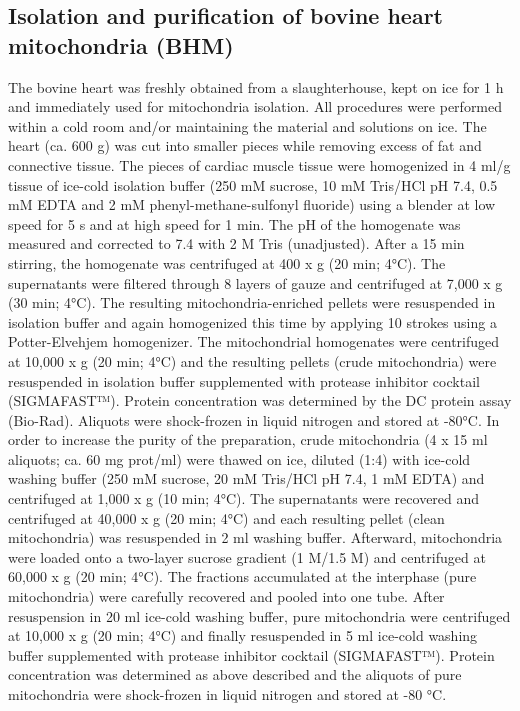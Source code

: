 \subsection*{Isolation and purification of bovine heart mitochondria (BHM)}
The bovine heart was freshly obtained from a slaughterhouse, kept on ice for 1 h and immediately used for mitochondria isolation. All procedures were performed within a cold room and/or maintaining the material and solutions on ice. The heart (ca. 600 g) was cut into smaller pieces while removing excess of fat and connective tissue. The pieces of cardiac muscle tissue were homogenized in 4 ml/g tissue of ice-cold isolation buffer (250 mM sucrose, 10 mM Tris/HCl pH 7.4, 0.5 mM EDTA and 2 mM phenyl-methane-sulfonyl fluoride) using a blender at low speed for 5 s and at high speed for 1 min. The pH of the homogenate was measured and corrected to 7.4 with 2 M Tris (unadjusted). After a 15 min stirring, the homogenate was centrifuged at 400 x g (20 min; 4°C). The supernatants were filtered through 8 layers of gauze and centrifuged at 7,000 x g (30 min; 4°C). The resulting mitochondria-enriched pellets were resuspended in isolation buffer and again homogenized this time by applying 10 strokes using a Potter-Elvehjem homogenizer. The mitochondrial homogenates were centrifuged at 10,000 x g (20 min; 4°C) and the resulting pellets (crude mitochondria) were resuspended in isolation buffer supplemented with protease inhibitor cocktail (SIGMAFAST™). Protein concentration was determined by the DC protein assay (Bio-Rad). Aliquots were shock-frozen in liquid nitrogen and stored at -80°C. In order to increase the purity of the preparation, crude mitochondria (4 x 15 ml aliquots; ca. 60 mg prot/ml) were thawed on ice, diluted (1:4) with ice-cold washing buffer (250 mM sucrose, 20 mM Tris/HCl pH 7.4, 1 mM EDTA) and centrifuged at 1,000 x g (10 min; 4°C). The supernatants were recovered and centrifuged at 40,000 x g (20 min; 4°C) and each resulting pellet (clean mitochondria) was resuspended in 2 ml washing buffer. Afterward, mitochondria were loaded onto a two-layer sucrose gradient (1 M/1.5 M) and centrifuged at 60,000 x g (20 min; 4°C). The fractions accumulated at the interphase (pure mitochondria) were carefully recovered and pooled into one tube. After resuspension in 20 ml ice-cold washing buffer, pure mitochondria were centrifuged at 10,000 x g (20 min; 4°C) and finally resuspended in 5 ml ice-cold washing buffer supplemented with protease inhibitor cocktail (SIGMAFAST™). Protein concentration was determined as above described and the aliquots of pure mitochondria were shock-frozen in liquid nitrogen and stored at -80 °C.
%

